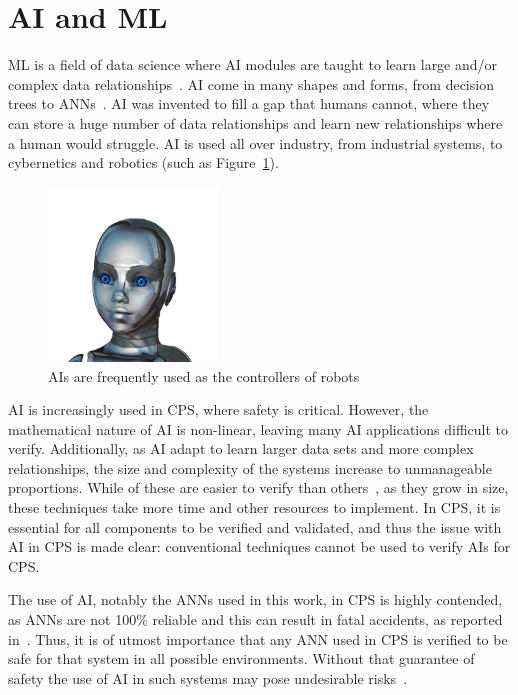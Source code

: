 \section{\acf{AI} and \acf{ML}}
\acf{ML} is a field of data science where \acf{AI} modules are taught to learn large and/or complex data relationships~\cite{ai}.
\ac{AI} come in many shapes and forms, from decision trees to \acfp{ANN}~\cite{ai-types}.
\ac{AI} was invented to fill a gap that humans cannot, where they can store a huge number of data relationships and learn new relationships where a human would struggle.
\ac{AI} is used all over industry, from industrial systems, to cybernetics and robotics (such as Figure~\ref{fig:ai-girl}).

\begin{figure}[h]
	\centering
	\includegraphics[width=0.4\textwidth]{Content/fig/ai-girl.png}
	\caption{\acp{AI} are frequently used as the controllers of robots~\cite{robotgirl-pic} \label{fig:ai-girl}}
\end{figure}

\ac{AI} is increasingly used in \ac{CPS}, where safety is critical.
However, the mathematical nature of \ac{AI} is non-linear, leaving many \ac{AI} applications difficult to verify.
Additionally, as \ac{AI} adapt to learn larger data sets and more complex relationships, the size and complexity of the systems increase to unmanageable proportions.
While of these are easier to verify than others~\cite{aiverify}, as they grow in size, these techniques take more time and other resources to implement.
In \ac{CPS}, it is essential for all components to be verified and validated, and thus the issue with \ac{AI} in \ac{CPS} is made clear: conventional techniques cannot be used to verify \acp{AI} for \ac{CPS}.

The use of \ac{AI}, notably the \acp{ANN} used in this work, in \ac{CPS} is highly contended, as \acp{ANN} are not 100\% reliable and this can result in fatal accidents, as reported in~\cite{coldewey_2018}.
Thus, it is of utmost importance that any \ac{ANN} used in \ac{CPS} is verified to be safe for that system in all possible environments.
Without that guarantee of safety the use of \ac{AI} in such systems may pose undesirable risks~\cite{ANNSafety2018}.

